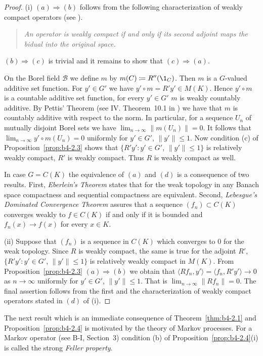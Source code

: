 \begin{proof}
(i) $(a)\Rightarrow(b)$ follows from the following characterization of
weakly compact operators (see \eg \citet[II. Proposition~9.4 ]{schaefer:1974}).
\begin{quote}
    \emph{
    An operator is weakly compact if and only if its second adjoint
    maps the bidual into the original space.
    }
\end{quote}
$(b)\Rightarrow(c)$ is trivial and it remains to show that $(c) \Rightarrow (a)$.

On the Borel field $\mathcal{B}$ we define $m$ by $m(C)  \coloneq  R''(\1_C)$.
Then $m$ is
a $G$-valued additive set function.
For $y' \in G'$ we have
$y'\circ m = R'y' \in M(K)$.
Hence $y'\circ m$ is a countable additive set function, for every $y' \in G'$  \ie $m$ is weakly countably additive.
By Pettis' Theorem (see IV. Theorem~10.1 in 
\citet{dunfordschwartz:1958}) we have
that $m$ is countably additive with respect to the norm.
In particular, for a sequence $U_n$ of mutually disjoint Borel sets we have
$\lim_{n\to\infty}\|m(U_n)\| = 0$.
It follows that $\lim_{n\to\infty}y'\circ m(U_n) = 0$ uniformly for
$y' \in G'$, $\|y'\| \leq 1$.
Now condition (c) of Proposition~\ref{prop:b4-2.3} shows that $\{R'y'
\colon y' \in G'$, $\|y'\| \leq 1\}$ is relatively weakly compact, \ie  $R'$ is
weakly compact.
Thus $R$ is weakly compact as well.

In case $G = C(K)$ the equivalence of $(a)$ and $(d)$ is a consequence of
two results. First, \emph{Eberlein's Theorem} states that for the weak topology in any Banach space compactness and sequential compactness are
equivalent.
Second, \emph{Lebesgue's Dominated Convergence Theorem} assures
that a sequence $(f_n) \subset C(K)$ converges weakly to $f \in C(K)$ if and
only if it is bounded and $f_n(x) \to f(x)$ for every $x \in K$.
	
(ii) Suppose that $(f_n)$ is a sequence in $C(K)$ which converges to $0$ for
the weak topology.
Since $R$ is weakly compact, the same is true for
the adjoint $R'$, \ie $\{R'y' \colon y' \in G'$, $\|y'\| \leq 1\}$ is relatively weakly compact in $M(K)$.
From Proposition~\ref{prop:b4-2.3} $(a)\Rightarrow(b)$ we obtain that
$\langle Rf_n,y'\rangle = \langle f_n,R'y'\rangle \to 0$ as $n \to \infty$ uniformly for $y' \in G'$, $\|y'\|\leq1$.
That is $\lim_{n\to\infty}\|Rf_n\| = 0$.
The final assertion follows from the first and the characterization of
weakly compact operators stated in $(d)$ of (i).
\end{proof}
The next result which is an immediate consequence of Theorem~\ref{thm:b4-2.1} and
Proposition~\ref{prop:b4-2.4} is motivated by the theory of Markov processes.
For a Markov operator (see B-I, Section~3) condition (b) of Proposition~\ref{prop:b4-2.4}(i) is called the strong \emph{Feller property}.

